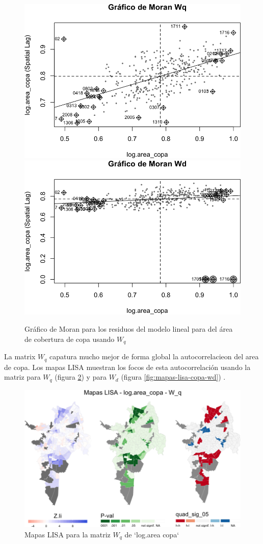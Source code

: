 \documentclass[12pt,]{book}
\begin{document}
\begin{figure}
\includegraphics[width=0.49\linewidth]{tesis-unigis_files/figure-latex/moranplot-copa-w-1} \includegraphics[width=0.49\linewidth]{tesis-unigis_files/figure-latex/moranplot-copa-w-2} \caption{Gráfico de Moran para los residuos del modelo lineal para del área de cobertura de copa usando $W_{q}$}\label{fig:moranplot-copa-w}
\end{figure}

La matrix \(W_q\) capatura mucho mejor de forma global la
autocorrelacieon del area de copa. Los mapas LISA muestran los focos de
esta autocorrelación usando la matriz para \(W_q\) (figura
\ref{fig:mapas-lisa-copa-wq}) y para \(W_d\) (figura
\ref{fig:mapas-lisa-copa-wd}) .

\begin{figure}
\includegraphics[width=1\linewidth]{tesis-unigis_files/figure-latex/mapas-lisa-copa-wq-1} \caption{Mapas LISA para la matriz $W_q$ de `log.area copa`}\label{fig:mapas-lisa-copa-wq}
\end{figure}
\end{document}
